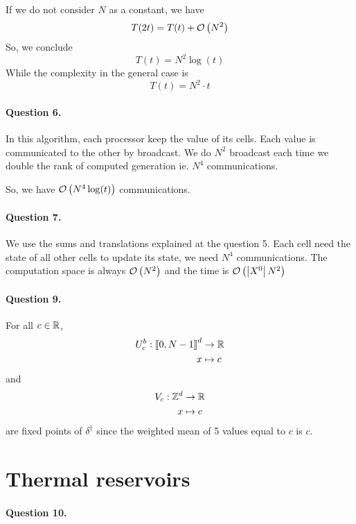 If we do not consider $N$ as a constant, we have
$$
    T(2t) = T(t) + \mathcal O \left( N^2 \right)
$$
So, we conclude
$$
    T(t)=N^2\log(t)
$$
While the complexity in the general case is
$$
    T(t)=N^2\cdot t
$$

\paragraph{Question 6.}

In this algorithm, each processor keep the value of its cells. Each value is communicated to the other by broadcast. We do $N^2$ broadcast each time we double the rank of computed generation ie. $N^4$ communications.

So, we have $\mathcal O \left( N^4\log(t) \right)$ communications.

\paragraph{Question 7.}

We use the sums and translations explained at the question 5. Each cell need the state of all other cells to update its state, we need $N^4$ communications. The computation space is always $\mathcal O \left( N^2 \right)$ and the time is $\mathcal O \left( \left \lvert X^0\right \rvert N^2 \right)$

\paragraph{Question 9.}

For all $c\in\mathbb{R}$,
$$
    \begin{aligned}
        U^b_c : \left\llbracket 0,N-1 \right\rrbracket^d &\to \mathbb{R}\\
        x &\mapsto c
    \end{aligned}
$$
and
$$
    \begin{aligned}
        V_c : \mathbb{Z}^d &\to \mathbb{R}\\
        x &\mapsto c
    \end{aligned}
$$
are fixed points of $\delta^\dagger$ since the weighted mean of 5 values equal to $c$ is $c$.

\section{Thermal reservoirs}

\paragraph{Question 10.}

